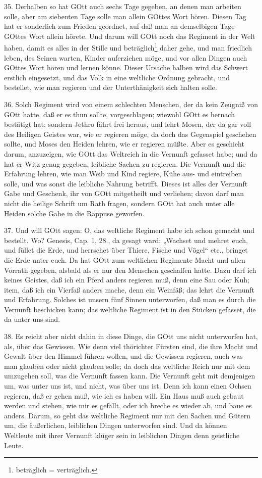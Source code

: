 35. Derhalben so hat GOtt auch sechs Tage
gegeben, an denen man arbeiten solle, aber am siebenten Tage solle man allein GOttes Wort hören. Diesen Tag hat er sonderlich zum Frieden geordnet, auf daß man an demselbigen Tage GOttes Wort allein hörete. Und darum will GOtt noch das Regiment in der Welt haben, damit es alles in der Stille und beträglich\footnote{beträglich = verträglich.} daher gehe, und man friedlich leben, des Seinen warten, Kinder auferziehen möge, und vor allen Dingen auch GOttes Wort hören und lernen könne. Dieser Ursache halben wird das Schwert erstlich eingesetzt, und das Volk in eine weltliche Ordnung gebracht, und bestellet, wie man regieren und der Unterthänigkeit sich halten solle.

36. Solch Regiment wird von einem schlechten Menschen, der da kein Zeugniß von GOtt hatte, daß er es thun sollte, vorgeschlagen; wiewohl GOtt es hernach bestätigt hat; sondern Jethro fährt frei heraus, und lehrt Mosen, der da gar voll des Heiligen Geistes war, wie er regieren möge, da doch das Gegenspiel geschehen sollte, und Moses den Heiden lehren, wie er regieren müßte. Aber es geschieht darum, anzuzeigen, wie GOtt das Weltreich in die Vernunft gefasset habe; und da hat er Witz genug gegeben, leibliche Sachen zu regieren. Die Vernunft und die Erfahrung lehren, wie man Weib und Kind regiere, Kühe aus- und eintreiben solle, und was sonst die leibliche Nahrung betrifft. Dieses ist alles der Vernunft Gabe und Geschenk, ihr von GOtt mitgetheilt und verliehen; davon darf man nicht die heilige Schrift um Rath fragen, sondern GOtt hat auch unter alle Heiden solche Gabe in die Rappuse geworfen.

37. Und will GOtt sagen: O, das weltliche Regiment habe ich schon gemacht und bestellt. Wo? Genesis, Cap. 1, 28., da gesagt ward: „Wachset und mehret euch, und füllet die Erde, und herrschet über Thiere, Fische und Vögel“ etc., bringet die Erde unter euch. Da hat GOtt zum weltlichen Regimente Macht und allen Vorrath gegeben, alsbald als er nur den Menschen geschaffen hatte. Dazu darf ich keines Geistes, daß ich ein Pferd anders regieren muß, denn eine Sau oder Kuh; item, daß ich ein Vierfaß anders mache, denn ein Weinfäß; das lehrt die Vernunft und Erfahrung. Solches ist unsern fünf Sinnen unterworfen, daß man es durch die Vernunft beschicken kann; das weltliche Regiment ist in den Stücken gefasset, die da unter uns sind.

38. Es reicht aber nicht dahin in diese Dinge, die GOtt uns nicht unterworfen hat, als, über das Gewissen. Wie denn viel thörichter Fürsten sind, die ihre Macht und Gewalt über den Himmel führen wollen, und die Gewissen regieren, auch was man glauben oder nicht glauben solle; da doch das weltliche Reich nur mit dem umzugehen soll, was die Vernunft fassen kann. Die Vernunft geht mit demjenigen um, was unter uns ist, und nicht, was über uns ist. Denn ich kann einen Ochsen regieren, daß er gehen muß, wie ich es haben will. Ein Haus muß auch gebaut werden und stehen, wie mir es gefällt, oder ich breche es wieder ab, und baue es anders. Darum, so geht das weltliche Regiment nur mit den Sachen und Gütern um, die äußerlichen, leiblichen Dingen unterworfen sind. Und da können Weltleute mit ihrer Vernunft klüger sein in leiblichen Dingen denn geistliche Leute.

